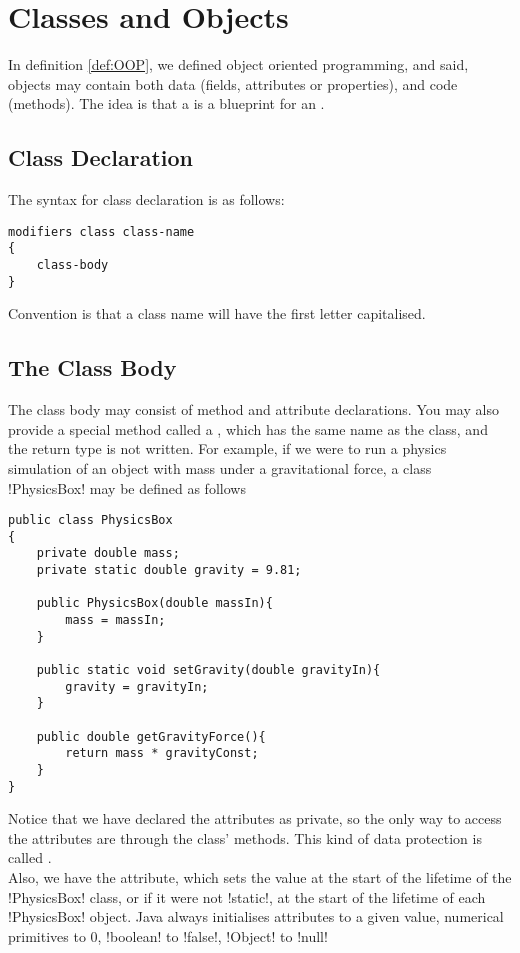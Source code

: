 \documentclass[11pt]{article}
\begin{document}
\section{Classes and Objects}
\label{sec:classesAndObjects}
In definition \ref{def:OOP}, we defined object oriented programming, and said, objects may contain both data (fields, attributes or properties), and code (methods). The idea is that a  is a blueprint for an . 
\subsection{Class Declaration}
The syntax for class declaration is as follows:
\vspace{-15pt}
\begin{lstlisting}[style=basic]
modifiers class class-name
{
    class-body
}
\end{lstlisting}
Convention is that a class name will have the first letter capitalised.
\subsection{The Class Body}
The class body may consist of method and attribute declarations. You may also provide a special method called a , which has the same name as the class, and the return type is not written. For example, if we were to run a physics simulation of an object with mass under a gravitational force, a class \inline!PhysicsBox! may be defined as follows
\begin{lstlisting}[caption=PhysicsBox, label=lst:PhysicsBox]
public class PhysicsBox
{
    private double mass;
    private static double gravity = 9.81;

    public PhysicsBox(double massIn){
        mass = massIn;
    }

    public static void setGravity(double gravityIn){
        gravity = gravityIn;
    }

    public double getGravityForce(){
        return mass * gravityConst;
    }   
}
\end{lstlisting}
Notice that we have declared the attributes as private, so the only way to access the attributes are through the class' methods. This kind of data protection is called . \\ Also, we have  the  attribute, which sets the value at the start of the lifetime of the \inline!PhysicsBox! class, or if it were not \inline!static!, at the start of the lifetime of each \inline!PhysicsBox! object. Java always initialises attributes to a given value, numerical primitives to 0, \inline!boolean! to \inline!false!, \inline!Object! to \inline!null!
\end{document}
